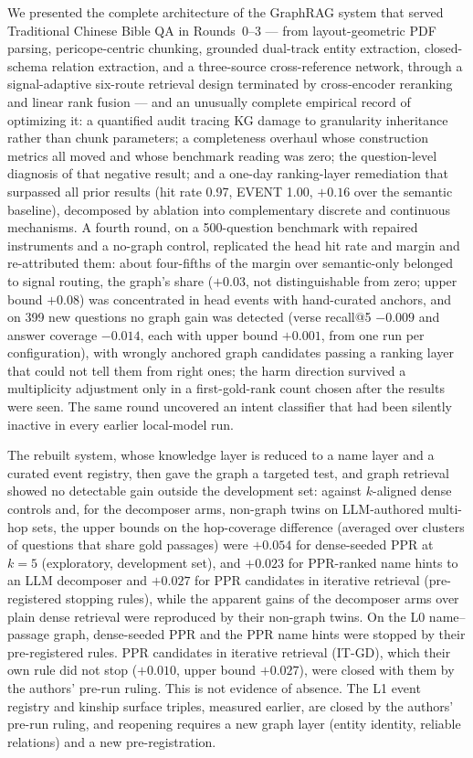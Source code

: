 We presented the complete architecture of the GraphRAG system that
served Traditional Chinese Bible QA in Rounds~0--3 --- from
layout-geometric PDF parsing, pericope-centric chunking, grounded dual-track entity extraction,
closed-schema relation extraction, and a three-source cross-reference
network, through a signal-adaptive six-route retrieval design
terminated by cross-encoder reranking and linear rank fusion --- and an
unusually complete empirical record of optimizing it: a quantified
audit tracing KG damage to granularity inheritance rather than chunk
parameters; a completeness overhaul whose construction metrics all
moved and whose benchmark reading was zero; the question-level
diagnosis of that negative result; and a one-day ranking-layer
remediation that surpassed all prior results (hit rate 0.97, EVENT
1.00, $+0.16$ over the semantic baseline), decomposed by ablation into
complementary discrete and continuous mechanisms. A fourth round, on a
500-question benchmark with repaired instruments and a no-graph
control, replicated the head hit rate and margin and re-attributed
them: about four-fifths of the margin over semantic-only belonged to
signal routing, the graph's share ($+0.03$, not distinguishable from
zero; upper bound $+0.08$) was concentrated in head events with
hand-curated anchors, and on 399 new questions no graph gain was
detected (verse recall@5 $-0.009$ and answer coverage $-0.014$, each
with upper bound $+0.001$, from one run per configuration), with wrongly
anchored graph candidates passing a ranking layer that could not tell
them from right ones; the harm direction survived a multiplicity
adjustment only in a first-gold-rank count chosen after the results
were seen. The same round uncovered an intent classifier that had been
silently inactive in every earlier local-model run.

The rebuilt system, whose knowledge layer is reduced to a name layer and
a curated event registry, then gave the graph a targeted test, and graph retrieval showed no detectable gain outside the development set: against $k$-aligned dense controls and, for the decomposer arms, non-graph twins on LLM-authored multi-hop sets, the upper bounds on
the hop-coverage difference (averaged over clusters of questions that
share gold passages) were $+0.054$ for dense-seeded PPR at $k=5$
(exploratory, development set), and $+0.023$ for PPR-ranked name hints
to an LLM decomposer and $+0.027$ for PPR candidates in iterative
retrieval (pre-registered stopping rules), while the apparent gains of
the decomposer arms over plain dense retrieval were reproduced by their
non-graph twins. On the L0 name--passage graph, dense-seeded PPR and the
PPR name hints were stopped by their pre-registered rules. PPR
candidates in iterative retrieval (IT-GD), which their own rule did not
stop ($+0.010$, upper bound $+0.027$), were closed with them by the
authors' pre-run ruling. This is not evidence of absence.
The L1 event registry and kinship surface triples, measured earlier,
are closed by the authors' pre-run ruling, and reopening requires a new
graph layer (\eg entity identity, reliable relations) and a new
pre-registration.

